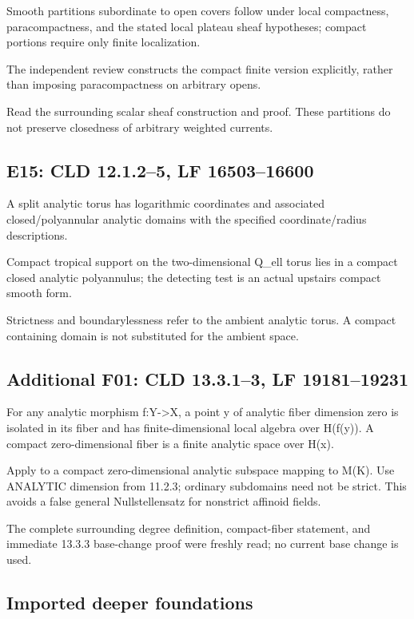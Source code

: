 \documentclass[11pt]{article}
\begin{document}
Smooth partitions subordinate to open covers follow under local compactness, paracompactness, and the stated local plateau sheaf hypotheses; compact portions require only finite localization.

The independent review constructs the compact finite version explicitly, rather than imposing paracompactness on arbitrary opens.

Read the surrounding scalar sheaf construction and proof. These partitions do not preserve closedness of arbitrary weighted currents.

\subsection*{E15: CLD 12.1.2--5, LF 16503--16600}

A split analytic torus has logarithmic coordinates and associated closed/polyannular analytic domains with the specified coordinate/radius descriptions.

Compact tropical support on the two-dimensional Q\_ell torus lies in a compact closed analytic polyannulus; the detecting test is an actual upstairs compact smooth form.

Strictness and boundarylessness refer to the ambient analytic torus. A compact containing domain is not substituted for the ambient space.

\subsection*{Additional F01: CLD 13.3.1--3, LF 19181--19231}

For any analytic morphism f:Y->X, a point y of analytic fiber dimension zero is isolated in its fiber and has finite-dimensional local algebra over H(f(y)). A compact zero-dimensional fiber is a finite analytic space over H(x).

Apply to a compact zero-dimensional analytic subspace mapping to M(K). Use ANALYTIC dimension from 11.2.3; ordinary subdomains need not be strict. This avoids a false general Nullstellensatz for nonstrict affinoid fields.

The complete surrounding degree definition, compact-fiber statement, and immediate 13.3.3 base-change proof were freshly read; no current base change is used.

\subsection*{Imported deeper foundations}
\end{document}
